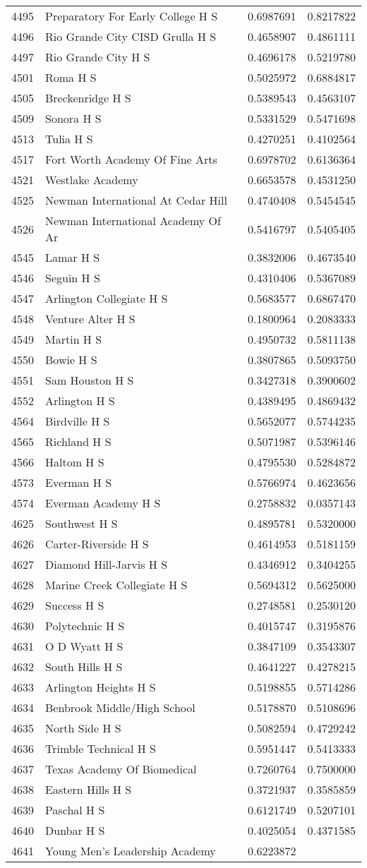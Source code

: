 \documentclass[
]{article}
\begin{document}
\begin{longtable}[]{@{}llrr@{}}
4495 & Preparatory For Early College H S & 0.6987691 &
0.8217822\tabularnewline
4496 & Rio Grande City CISD Grulla H S & 0.4658907 &
0.4861111\tabularnewline
4497 & Rio Grande City H S & 0.4696178 & 0.5219780\tabularnewline
4501 & Roma H S & 0.5025972 & 0.6884817\tabularnewline
4505 & Breckenridge H S & 0.5389543 & 0.4563107\tabularnewline
4509 & Sonora H S & 0.5331529 & 0.5471698\tabularnewline
4513 & Tulia H S & 0.4270251 & 0.4102564\tabularnewline
4517 & Fort Worth Academy Of Fine Arts & 0.6978702 &
0.6136364\tabularnewline
4521 & Westlake Academy & 0.6653578 & 0.4531250\tabularnewline
4525 & Newman International At Cedar Hill & 0.4740408 &
0.5454545\tabularnewline
4526 & Newman International Academy Of Ar & 0.5416797 &
0.5405405\tabularnewline
4545 & Lamar H S & 0.3832006 & 0.4673540\tabularnewline
4546 & Seguin H S & 0.4310406 & 0.5367089\tabularnewline
4547 & Arlington Collegiate H S & 0.5683577 & 0.6867470\tabularnewline
4548 & Venture Alter H S & 0.1800964 & 0.2083333\tabularnewline
4549 & Martin H S & 0.4950732 & 0.5811138\tabularnewline
4550 & Bowie H S & 0.3807865 & 0.5093750\tabularnewline
4551 & Sam Houston H S & 0.3427318 & 0.3900602\tabularnewline
4552 & Arlington H S & 0.4389495 & 0.4869432\tabularnewline
4564 & Birdville H S & 0.5652077 & 0.5744235\tabularnewline
4565 & Richland H S & 0.5071987 & 0.5396146\tabularnewline
4566 & Haltom H S & 0.4795530 & 0.5284872\tabularnewline
4573 & Everman H S & 0.5766974 & 0.4623656\tabularnewline
4574 & Everman Academy H S & 0.2758832 & 0.0357143\tabularnewline
4625 & Southwest H S & 0.4895781 & 0.5320000\tabularnewline
4626 & Carter-Riverside H S & 0.4614953 & 0.5181159\tabularnewline
4627 & Diamond Hill-Jarvis H S & 0.4346912 & 0.3404255\tabularnewline
4628 & Marine Creek Collegiate H S & 0.5694312 &
0.5625000\tabularnewline
4629 & Success H S & 0.2748581 & 0.2530120\tabularnewline
4630 & Polytechnic H S & 0.4015747 & 0.3195876\tabularnewline
4631 & O D Wyatt H S & 0.3847109 & 0.3543307\tabularnewline
4632 & South Hills H S & 0.4641227 & 0.4278215\tabularnewline
4633 & Arlington Heights H S & 0.5198855 & 0.5714286\tabularnewline
4634 & Benbrook Middle/High School & 0.5178870 &
0.5108696\tabularnewline
4635 & North Side H S & 0.5082594 & 0.4729242\tabularnewline
4636 & Trimble Technical H S & 0.5951447 & 0.5413333\tabularnewline
4637 & Texas Academy Of Biomedical & 0.7260764 &
0.7500000\tabularnewline
4638 & Eastern Hills H S & 0.3721937 & 0.3585859\tabularnewline
4639 & Paschal H S & 0.6121749 & 0.5207101\tabularnewline
4640 & Dunbar H S & 0.4025054 & 0.4371585\tabularnewline
4641 & Young Men's Leadership Academy & 0.6223872 &

\end{longtable}
\end{document}
